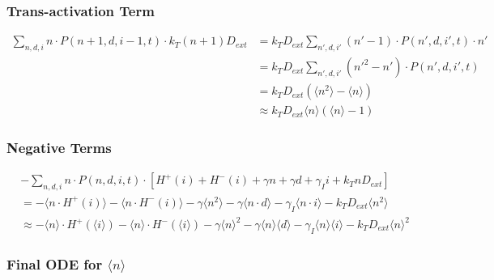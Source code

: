 \documentclass{article}
\begin{document}
\begin{flushleft}
\subsubsection*{Trans-activation Term}
\begin{align*}
\sum_{n,d,i} n \cdot P(n+1,d,i-1,t) \cdot k_T(n+1)D_{ext} &= k_T D_{ext} \sum_{n',d,i'} (n'-1) \cdot P(n',d,i',t) \cdot n' \\
&= k_T D_{ext} \sum_{n',d,i'} (n'^2 - n') \cdot P(n',d,i',t) \\
&= k_T D_{ext} (\langle n^2 \rangle - \langle n \rangle) \\
&\approx k_T D_{ext} \langle n \rangle (\langle n \rangle - 1)
\end{align*}

\subsubsection*{Negative Terms}
\begin{align*}
&-\sum_{n,d,i} n \cdot P(n,d,i,t) \cdot [H^+(i) + H^-(i) + \gamma n + \gamma d + \gamma_I i + k_T n D_{ext}] \\
&= -\langle n \cdot H^+(i) \rangle - \langle n \cdot H^-(i) \rangle - \gamma \langle n^2 \rangle - \gamma \langle n \cdot d \rangle - \gamma_I \langle n \cdot i \rangle - k_T D_{ext} \langle n^2 \rangle \\
&\approx -\langle n \rangle \cdot H^+(\langle i \rangle) - \langle n \rangle \cdot H^-(\langle i \rangle) - \gamma \langle n \rangle^2 - \gamma \langle n \rangle \langle d \rangle - \gamma_I \langle n \rangle \langle i \rangle - k_T D_{ext} \langle n \rangle^2
\end{align*}

\subsubsection*{Final ODE for $\langle n \rangle$}


\end{flushleft}
\end{document}
